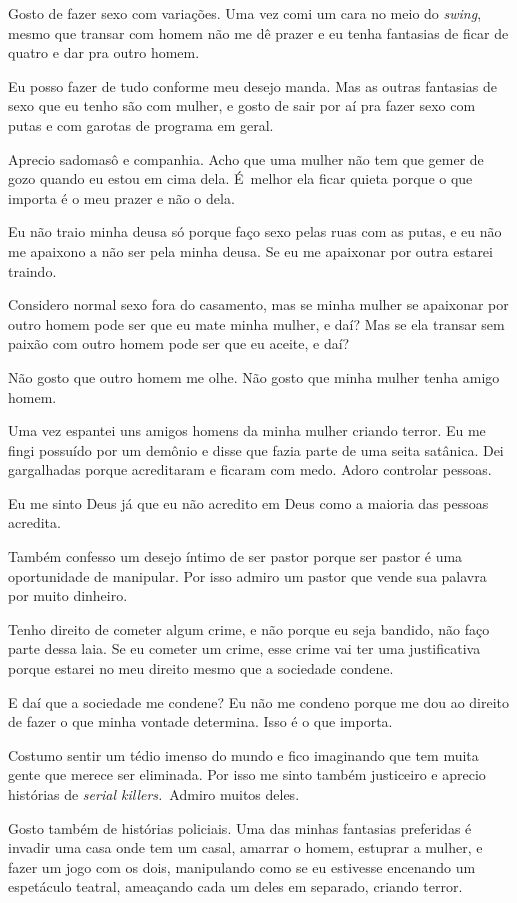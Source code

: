 Gosto de fazer sexo com variações. Uma vez comi um cara no meio do
\emph{swing}, mesmo que transar com homem não me dê prazer e eu tenha
fantasias de ficar de quatro e dar pra outro homem.

Eu posso fazer de tudo conforme meu desejo manda. Mas as outras
fantasias de sexo que eu tenho são com mulher, e gosto de sair por aí
pra fazer sexo com putas e com garotas de programa em geral.

Aprecio sadomasô e companhia. Acho que uma mulher não tem que gemer de
gozo quando eu estou em cima dela. É~melhor ela ficar quieta porque o
que importa é o meu prazer e não o dela.

Eu não traio minha deusa só porque faço sexo pelas ruas com as putas, e
eu não me apaixono a não ser pela minha deusa. Se eu me apaixonar por
outra estarei traindo.

Considero normal sexo fora do casamento, mas se minha mulher se
apaixonar por outro homem pode ser que eu mate minha mulher, e daí? Mas
se ela transar sem paixão com outro homem pode ser que eu aceite, e daí?

Não gosto que outro homem me olhe. Não gosto que minha mulher tenha
amigo homem.

Uma vez espantei uns amigos homens da minha mulher criando terror. Eu me
fingi possuído por um demônio e disse que fazia parte de uma seita
satânica. Dei gargalhadas porque acreditaram e ficaram com medo. Adoro
controlar pessoas.

Eu me sinto Deus já que eu não acredito em Deus como a maioria das
pessoas acredita.

Também confesso um desejo íntimo de ser pastor porque ser pastor é uma
oportunidade de manipular. Por isso admiro um pastor que vende sua
palavra por muito dinheiro.

Tenho direito de cometer algum crime, e não porque eu seja bandido, não
faço parte dessa laia. Se eu cometer um crime, esse crime vai ter uma
justificativa porque estarei no meu direito mesmo que a sociedade
condene.

E daí que a sociedade me condene? Eu não me condeno porque me dou ao
direito de fazer o que minha vontade determina. Isso é o que importa.

Costumo sentir um tédio imenso do mundo e fico imaginando que tem muita
gente que merece ser eliminada. Por isso me sinto também justiceiro e
aprecio histórias de \emph{serial killers.}~Admiro muitos deles.

Gosto também de histórias policiais. Uma das minhas fantasias preferidas
é invadir uma casa onde tem um casal, amarrar o homem, estuprar a
mulher, e fazer um jogo com os dois, manipulando como se eu estivesse
encenando um espetáculo teatral, ameaçando cada um deles em separado,
criando terror.

